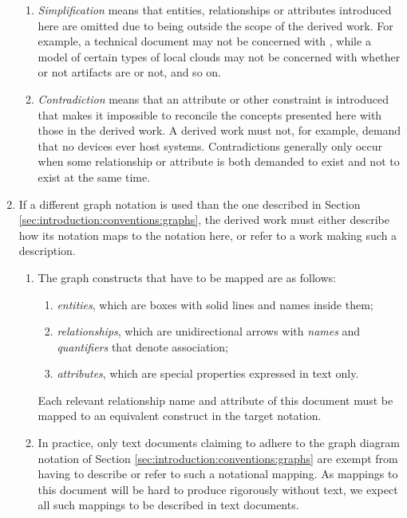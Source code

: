 \begin{enumerate}
\begin{enumerate}
	\item \textit{Simplification} means that entities, relationships or attributes introduced here are omitted due to being outside the scope of the derived work. For example, a technical document may not be concerned with , while a model of certain types of local clouds may not be concerned with whether or not artifacts are  or not, and so on.
	\item \textit{Contradiction} means that an attribute or other constraint is introduced that makes it impossible to reconcile the concepts presented here with those in the derived work. A derived work must not, for example, demand that no devices ever host systems. Contradictions generally only occur when some relationship or attribute is both demanded to exist and not to exist at the same time.
	\end{enumerate}
\item \label{sec:conformance:notation} If a different graph notation is used than the one described in Section \ref{sec:introduction:conventions:graphs}, the derived work must either describe how its notation maps to the notation here, or refer to a work making such a description.
	\begin{enumerate}
	\item The graph constructs that have to be mapped are as follows:
		\begin{enumerate}
		\item \textit{entities}, which are boxes with solid lines and names inside them;
		\item \textit{relationships}, which are unidirectional arrows with \textit{names} and \textit{quantifiers} that denote association;
		\item \textit{attributes}, which are special properties expressed in text only.
		\end{enumerate}
		Each relevant relationship name and attribute of this document must be mapped to an equivalent construct in the target notation.
	\item In practice, only text documents claiming to adhere to the graph diagram notation of Section \ref{sec:introduction:conventions:graphs} are exempt from having to describe or refer to such a notational mapping. As mappings to this document will be hard to produce rigorously without text, we expect all such mappings to be described in text documents.
	\end{enumerate}
\end{enumerate}

